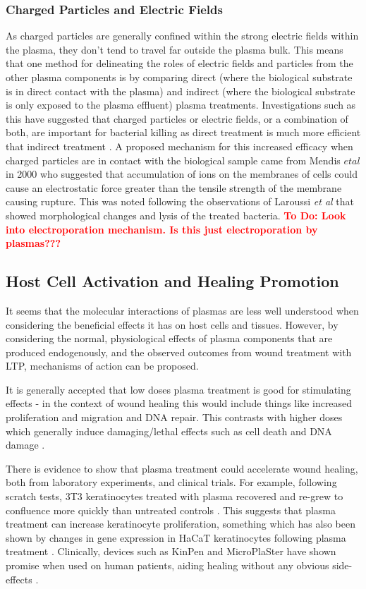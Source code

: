 \documentclass[11pt, oneside]{article}   	%
\newcommand{\todo}[1]{ \textcolor{red}{\bf{To Do:} #1}}
\begin{document}
\subsubsection{Charged Particles and Electric Fields}
As charged particles are generally confined within the strong electric fields within the plasma, they don't tend to travel far outside the plasma bulk.
This means that one method for delineating the roles of electric fields and particles from the other plasma components is by comparing direct (where the biological substrate is in direct contact with the plasma) and indirect (where the biological substrate is only exposed to the plasma effluent) plasma treatments.
Investigations such as this have suggested that charged particles or electric fields, or a combination of both, are important for bacterial killing as direct treatment is much more efficient that indirect treatment \cite{Fridman2007comparison}.
A proposed mechanism for this increased efficacy when charged particles are in contact with the biological sample came from Mendis $et al$ in 2000 \cite{Mendis2000a} who suggested that accumulation of ions on the membranes of cells could cause an electrostatic force greater than the tensile strength of the membrane causing rupture.
This was noted following the observations of Laroussi \textit{et al} \cite{Laroussi1999images} that showed morphological changes and lysis of the treated bacteria.
\todo{Look into electroporation mechanism. Is this just electroporation by plasmas???}

\subsection{Host Cell Activation and Healing Promotion}
It seems that the molecular interactions of plasmas are less well understood when considering the beneficial effects it has on host cells and tissues.
However, by considering the normal, physiological effects of plasma components that are produced endogenously, and the observed outcomes from wound treatment with LTP, mechanisms of action can be proposed.

It is generally accepted that low doses plasma treatment is good for stimulating effects - in the context of wound healing this would include things like increased proliferation and migration and DNA repair. 
This contrasts with higher doses which generally induce damaging/lethal effects such as cell death and DNA damage \cite{Haertel2014nonthermal}. 

There is evidence to show that plasma treatment could accelerate wound healing, both from laboratory experiments, and clinical trials.
For example, following scratch tests, 3T3 keratinocytes treated with plasma recovered and re-grew to confluence more quickly than untreated controls \cite{Tipa2011plasma}.
This suggests that plasma treatment can increase keratinocyte proliferation, something which has also been shown by changes in gene expression in HaCaT keratinocytes following plasma treatment \cite{Barton2013nonthermal}.
Clinically, devices such as KinPen and MicroPlaSter have shown promise when used on human patients, aiding healing without any obvious side-effects \cite{Isbary2013cold, Isbary2012successful, Isbary2010a, Bekeschus2016the}.
\end{document}
